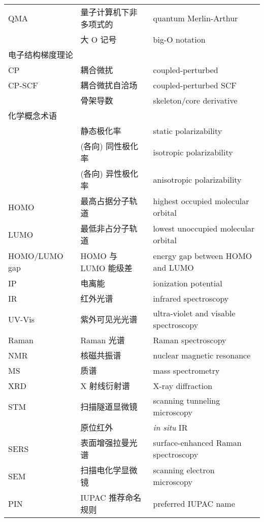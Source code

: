 \begin{longtable}{lll}
    QMA & 量子计算机下非多项式的 & quantum Merlin-Arthur \\
    & 大 O 记号 & big-O notation \\
    \midrule
    \multicolumn{3}{l}{\textsf{电子结构梯度理论}} \\
    CP & 耦合微扰 & coupled-perturbed \\
    CP-SCF & 耦合微扰自洽场 & coupled-perturbed SCF \\
    & 骨架导数 & skeleton/core derivative \\
    \midrule
    \multicolumn{3}{l}{\textsf{化学概念术语}} \\
    & 静态极化率 & static polarizability \\
    & (各向) 同性极化率 & isotropic polarizability \\
    & (各向) 异性极化率 & anisotropic polarizability \\
    HOMO & 最高占据分子轨道 & highest occupied molecular orbital \\
    LUMO & 最低非占分子轨道 & lowest unoccupied molecular orbital \\
    HOMO/LUMO gap & HOMO 与 LUMO 能级差 & energy gap between HOMO and LUMO \\
    IP & 电离能 & ionization potential \\
    IR & 红外光谱 & infrared spectroscopy \\
    UV-Vis & 紫外可见光光谱 & ultra-violet and visable spectroscopy \\
    Raman & Raman 光谱 & Raman spectroscopy \\
    NMR & 核磁共振谱 & nuclear magnetic resonance \\
    MS & 质谱 & mass spectrometry \\
    XRD & X 射线衍射谱 & X-ray diffraction \\
    STM & 扫描隧道显微镜 & scanning tunneling microscopy \\
    & 原位红外 & \emph{in situ} IR \\
    SERS & 表面增强拉曼光谱 & surface-enhanced Raman spectroscopy \\
    SEM & 扫描电化学显微镜 & scanning electron microscopy \\
    PIN & IUPAC 推荐命名规则 & preferred IUPAC name \\
\end{longtable}

\endgroup